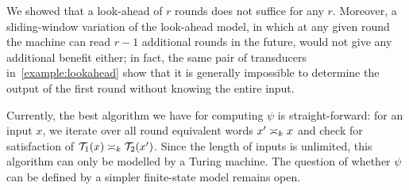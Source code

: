 We showed that a look-ahead of $r$ rounds does not suffice for any $r$.
Moreover, a sliding-window variation of the look-ahead model, in which at any given round the machine can read $r-1$ additional rounds in the future, would not give any additional benefit either; in fact, the same pair of transducers in~\cref{example:lookahead} show that it is generally impossible to determine the output of the first round without knowing the entire input.

Currently, the best algorithm we have for computing $\psi$ is straight-forward: for an input $x$, we iterate over all round equivalent words $x'\req[k] x$ and check for satisfaction of $\cT_1(x) \req[k] \cT_2(x')$. Since the length of inputs is unlimited, this algorithm can only be modelled by a Turing machine.
The question of whether $\psi$ can be defined by a simpler finite-state model remains open.

